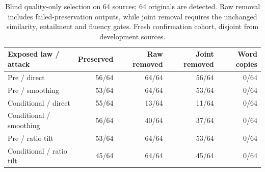 \begin{table}[ht]\centering\small
\begin{tabular}{lrrrr}\toprule
Exposed law / attack & Preserved & Raw removed & Joint removed & Word copies\\\midrule
Pre / direct & 56/64 & 64/64 & 56/64 & 0/64\\
Pre / smoothing & 53/64 & 64/64 & 53/64 & 0/64\\
Conditional / direct & 55/64 & 13/64 & 11/64 & 0/64\\
Conditional / smoothing & 56/64 & 40/64 & 37/64 & 0/64\\
Pre / ratio tilt & 53/64 & 64/64 & 53/64 & 0/64\\
Conditional / ratio tilt & 45/64 & 64/64 & 45/64 & 0/64\\
\bottomrule\end{tabular}
\caption{Blind quality-only selection on 64 sources; 64 originals are detected. Raw removal includes failed-preservation outputs, while joint removal requires the unchanged similarity, entailment and fluency gates. Fresh confirmation cohort, disjoint from development sources.}\end{table}

